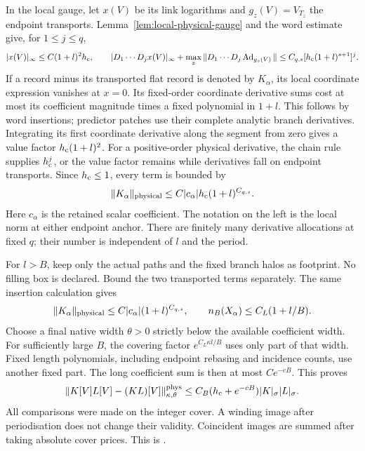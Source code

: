 \documentclass[11pt,reqno]{amsart}
\numberwithin{equation}{section}
\theoremstyle{definition}
\theoremstyle{remark}
\begin{document}
In the local gauge, let \(x(V)\) be its
link logarithms and \(g_z(V)=V_{T_z}\) the
endpoint transports.
Lemma~\ref{lem:local-physical-gauge} and the
word estimate give, for \(1\le j\le q\),
\[
 |x(V)|_\infty\le C(1+l)^2h_{\rm c},\qquad
 |D_1\cdots D_jx(V)|_\infty
       +\max_z\|D_1\cdots D_j\operatorname{Ad}_{g_z(V)}\|
              \le C_{q,s}[h_{\rm c}(1+l)^{s+1}]^j .
\]
If a record minus its transported flat
record is denoted by \(K_\alpha\), its
local coordinate expression vanishes at
\(x=0\).
Its fixed-order coordinate derivative sums
cost at most its coefficient magnitude
times a fixed polynomial in \(1+l\).
This follows by word insertions; predictor
patches use their complete analytic branch
derivatives.
Integrating its first coordinate derivative
along the segment from zero gives a value
factor \(h_{\rm c}(1+l)^2\).
For a positive-order physical derivative,
the chain rule supplies \(h_{\rm c}^j\),
or the value factor remains while derivatives
fall on endpoint transports.
Since \(h_{\rm c}\le1\), every term is bounded
by
\begin{equation}
 \|K_\alpha\|_{\rm physical}
          \le C|c_\alpha|h_{\rm c}(1+l)^{C_{q,s}} .
 \label{eq:compatible-short-record-price}
\end{equation}
Here \(c_\alpha\) is the retained scalar
coefficient. The notation on the left is
the local norm at either endpoint anchor.
There are finitely many derivative allocations
at fixed \(q\); their number is independent
of \(l\) and the period.

For \(l>B\), keep only the actual paths
and the fixed branch halos as footprint.
No filling box is declared.
Bound the two transported terms separately.
The same insertion calculation gives
\begin{equation}
       \|K_\alpha\|_{\rm physical}
                    \le C|c_\alpha|(1+l)^{C_{q,s}},
             \qquad n_B(X_\alpha)\le C_L(1+l/B).
 \label{eq:compatible-long-record-price}
\end{equation}
Choose a final native width \(\theta>0\)
strictly below the available coefficient
width. For sufficiently large \(B\),
the covering factor \(e^{C_L\kappa l/B}\)
uses only part of that width.
Fixed length polynomials, including endpoint
rebasing and incidence counts, use another
fixed part. The long coefficient sum is
then at most \(Ce^{-cB}\).
This proves
\begin{equation}
 \|K[V]L[V]-(KL)[V]\|_{\kappa,\theta}^{\rm phys}
       \le C_B(h_{\rm c}+e^{-cB})|K|_\sigma|L|_\sigma .
 \label{eq:compatible-product-defect}
\end{equation}
All comparisons were made on the integer
cover. A winding image after periodisation
does not change their validity.
Coincident images are summed after taking
absolute cover prices.
This is \cite[Lemma~25.1, p.~128]{Main}.
\end{document}
